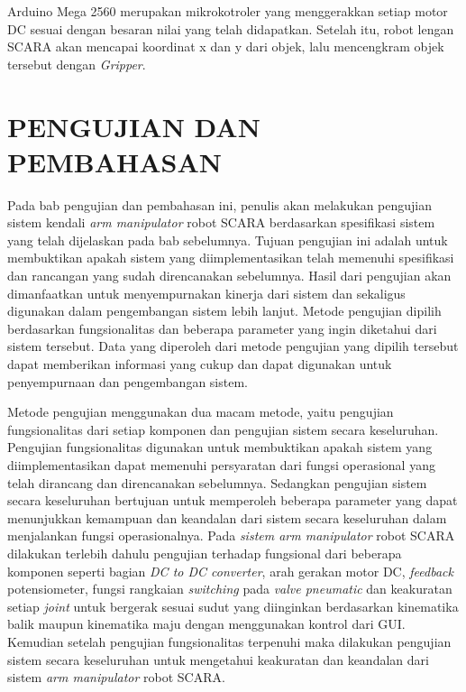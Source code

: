 Arduino Mega 2560 merupakan mikrokotroler yang menggerakkan setiap motor DC sesuai dengan besaran nilai yang telah didapatkan. Setelah itu, robot lengan SCARA akan mencapai koordinat x dan y dari objek, lalu mencengkram objek tersebut dengan \textit{Gripper}.

\chapter{PENGUJIAN DAN PEMBAHASAN}
Pada bab pengujian dan pembahasan ini, penulis akan melakukan pengujian sistem kendali\textit{ arm manipulator} robot SCARA berdasarkan spesifikasi sistem yang telah dijelaskan pada bab sebelumnya. Tujuan pengujian ini adalah untuk membuktikan apakah sistem yang diimplementasikan telah memenuhi spesifikasi dan rancangan yang sudah direncanakan sebelumnya. Hasil dari pengujian akan dimanfaatkan untuk menyempurnakan kinerja dari sistem dan sekaligus digunakan dalam pengembangan sistem lebih lanjut. Metode pengujian dipilih berdasarkan fungsionalitas dan beberapa parameter yang ingin diketahui dari sistem tersebut. Data yang diperoleh dari metode pengujian yang dipilih tersebut dapat memberikan informasi yang cukup dan dapat digunakan untuk penyempurnaan dan pengembangan sistem.
   
Metode pengujian menggunakan dua macam metode, yaitu pengujian fungsionalitas dari setiap komponen dan pengujian sistem secara keseluruhan. Pengujian fungsionalitas digunakan untuk membuktikan apakah sistem yang diimplementasikan dapat memenuhi persyaratan dari fungsi operasional yang telah dirancang dan direncanakan sebelumnya. Sedangkan pengujian sistem secara keseluruhan bertujuan untuk memperoleh beberapa parameter yang dapat menunjukkan kemampuan dan keandalan dari sistem secara keseluruhan dalam menjalankan fungsi operasionalnya. Pada \textit{sistem arm manipulator} robot SCARA dilakukan terlebih dahulu pengujian terhadap fungsional dari beberapa komponen seperti bagian \textit{DC to DC converter}, arah gerakan motor DC, \textit{feedback} potensiometer, fungsi rangkaian \textit{switching} pada \textit{valve pneumatic} dan keakuratan setiap \textit{joint} untuk bergerak sesuai sudut yang diinginkan berdasarkan kinematika balik maupun kinematika maju dengan menggunakan kontrol dari GUI.  Kemudian setelah pengujian fungsionalitas terpenuhi maka dilakukan pengujian sistem secara keseluruhan untuk mengetahui keakuratan dan keandalan dari sistem \textit{arm manipulator} robot SCARA.



